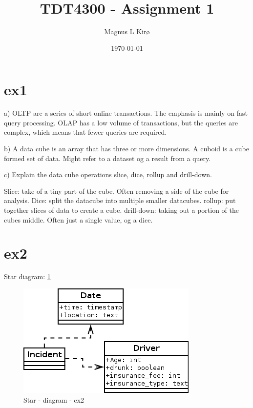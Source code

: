 \documentclass[12pt, a4paper]{article}
\title{TDT4300 - Assignment 1}
\author{
        Magnus L Kirø \\
}
\date{\today}
\begin{document}
\maketitle
{}


\section{ex1}
a) 
OLTP are a series of short online transactions. The emphasis is mainly on fast query processing. 
OLAP has a low volume of transactions, but the queries are complex, which means that fewer queries are required. 

b) 
A data cube is an array that has three or more dimensions. 
A cuboid is a cube formed set of data. Might refer to a dataset og a result from a query. 

c) 
Explain the data cube operations slice, dice, rollup and drill-down.

Slice: take of a tiny part of the cube. Often removing a side of the cube for analysis. 
Dice: split the datacube into multiple smaller datacubes. 
rollup: put together slices of data to create a cube. 
drill-down: taking out a portion of the cubes middle. Often just a single value, og a dice.

\section{ex2}

Star diagram: \ref{fig1}
\begin{figure}[htb]
    \centering
    \includegraphics[width=\textwidth]{star1}
    \caption{Star - diagram - ex2}
    \label{fig1}
\end{figure}
\end{document}
